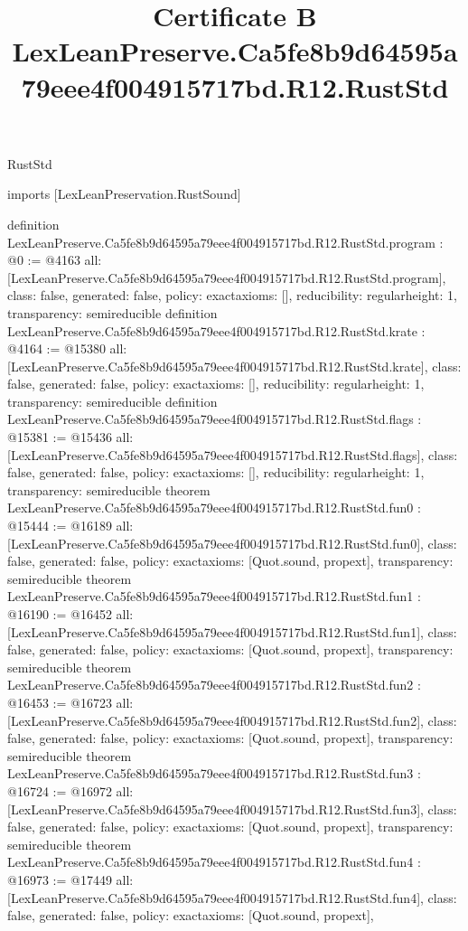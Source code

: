 \begin{lexlean}{RustStd}
\title{Certificate B LexLeanPreserve.Ca5fe8b9d64595a79eee4f004915717bd.R12.RustStd}
\begin{coremodule}
imports [LexLeanPreservation.RustSound]

definition LexLeanPreserve.Ca5fe8b9d64595a79eee4f004915717bd.R12.RustStd.program : @0 := @4163 {
  all: [LexLeanPreserve.Ca5fe8b9d64595a79eee4f004915717bd.R12.RustStd.program],
  class: false,
  generated: false,
  policy: exact{axioms: []},
  reducibility: regular{height: 1},
  transparency: semireducible
}
definition LexLeanPreserve.Ca5fe8b9d64595a79eee4f004915717bd.R12.RustStd.krate : @4164 := @15380 {
  all: [LexLeanPreserve.Ca5fe8b9d64595a79eee4f004915717bd.R12.RustStd.krate],
  class: false,
  generated: false,
  policy: exact{axioms: []},
  reducibility: regular{height: 1},
  transparency: semireducible
}
definition LexLeanPreserve.Ca5fe8b9d64595a79eee4f004915717bd.R12.RustStd.flags : @15381 := @15436 {
  all: [LexLeanPreserve.Ca5fe8b9d64595a79eee4f004915717bd.R12.RustStd.flags],
  class: false,
  generated: false,
  policy: exact{axioms: []},
  reducibility: regular{height: 1},
  transparency: semireducible
}
theorem LexLeanPreserve.Ca5fe8b9d64595a79eee4f004915717bd.R12.RustStd.fun0 : @15444 := @16189 {
  all: [LexLeanPreserve.Ca5fe8b9d64595a79eee4f004915717bd.R12.RustStd.fun0],
  class: false,
  generated: false,
  policy: exact{axioms: [Quot.sound, propext]},
  transparency: semireducible
}
theorem LexLeanPreserve.Ca5fe8b9d64595a79eee4f004915717bd.R12.RustStd.fun1 : @16190 := @16452 {
  all: [LexLeanPreserve.Ca5fe8b9d64595a79eee4f004915717bd.R12.RustStd.fun1],
  class: false,
  generated: false,
  policy: exact{axioms: [Quot.sound, propext]},
  transparency: semireducible
}
theorem LexLeanPreserve.Ca5fe8b9d64595a79eee4f004915717bd.R12.RustStd.fun2 : @16453 := @16723 {
  all: [LexLeanPreserve.Ca5fe8b9d64595a79eee4f004915717bd.R12.RustStd.fun2],
  class: false,
  generated: false,
  policy: exact{axioms: [Quot.sound, propext]},
  transparency: semireducible
}
theorem LexLeanPreserve.Ca5fe8b9d64595a79eee4f004915717bd.R12.RustStd.fun3 : @16724 := @16972 {
  all: [LexLeanPreserve.Ca5fe8b9d64595a79eee4f004915717bd.R12.RustStd.fun3],
  class: false,
  generated: false,
  policy: exact{axioms: [Quot.sound, propext]},
  transparency: semireducible
}
theorem LexLeanPreserve.Ca5fe8b9d64595a79eee4f004915717bd.R12.RustStd.fun4 : @16973 := @17449 {
  all: [LexLeanPreserve.Ca5fe8b9d64595a79eee4f004915717bd.R12.RustStd.fun4],
  class: false,
  generated: false,
  policy: exact{axioms: [Quot.sound, propext]},
}
\end{coremodule}
\end{lexlean}
